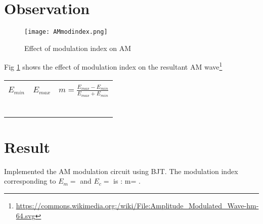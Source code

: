 \section*{Observation}


\begin{figure}[h]

\texttt{[image: AMmodindex.png]}
\caption{Effect of modulation index on AM}
\label{AMmodindex1}
\end{figure}
\noindent Fig \ref{AMmodindex1}  shows the effect of modulation index on the resultant AM wave\footnote{\url{https://commons.wikimedia.org:/wiki/File:Amplitude_Modulated_Wave-hm-64.svg}}
\begin{center}

\begin{tabular}{|l|l|l|}

\hline
 & &\\
 
$E_{min}$  & $E_{max}$ & $m=\frac{E_{max}-E_{min}}{E_{max}+E_{min}}$ \\
 & & \\ \hline
 & & \\ \hline
& & \\ \hline
& & \\ \hline
& & \\ \hline
& & \\ \hline

\end{tabular}
\end{center}
\section*{Result}
Implemented the AM modulation circuit using BJT.
The modulation index corresponding to $E_m=$ \textemdash \textemdash and $E_c=$ \textemdash\textemdash is : m= \textemdash\textemdash .

